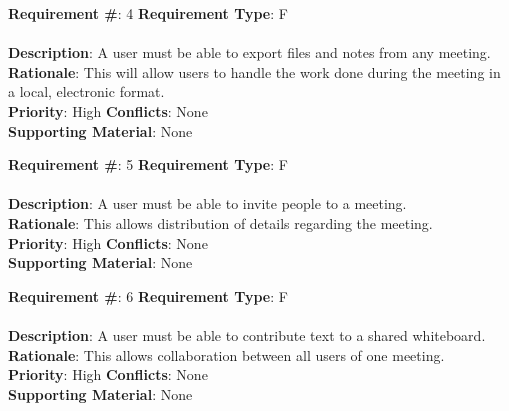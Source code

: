 \documentclass[11pt, oneside]{article}
\begin{document}
\begin{framed}
	\noindent\textbf{Requirement \#}: 4 \hfill \textbf{Requirement Type}: F \hfill\\\\
	\noindent\textbf{Description}: A user must be able to export files and notes from any meeting. \\
	\textbf{Rationale}: This will allow users to handle the work done during the meeting in a local, electronic format. \\
	\textbf{Priority}: High \hfill \textbf{Conflicts}: None \hfill\\
	\textbf{Supporting Material}: None\\
\end{framed}

\begin{framed}
	\noindent\textbf{Requirement \#}: 5 \hfill \textbf{Requirement Type}: F \hfill\\\\
	\noindent\textbf{Description}: A user must be able to invite people to a meeting. \\
	\textbf{Rationale}: This allows distribution of details regarding the meeting. \\
	\textbf{Priority}: High \hfill \textbf{Conflicts}: None \hfill\\
	\textbf{Supporting Material}: None\\
\end{framed}

\begin{framed}
	\noindent\textbf{Requirement \#}: 6 \hfill \textbf{Requirement Type}: F \hfill\\\\
	\noindent\textbf{Description}: A user must be able to contribute text to a shared whiteboard. \\
	\textbf{Rationale}: This allows collaboration between all users of one meeting. \\
	\textbf{Priority}: High \hfill \textbf{Conflicts}: None \hfill\\
	\textbf{Supporting Material}: None\\
\end{framed}
\end{document}
